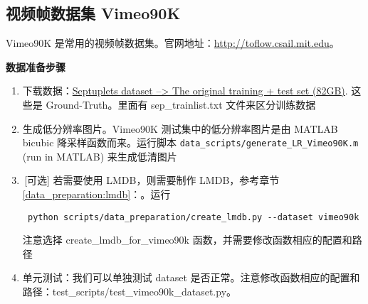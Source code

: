 \documentclass[../main.tex]{subfiles}
\begin{document}
\subsection{视频帧数据集 Vimeo90K}

Vimeo90K 是常用的视频帧数据集。官网地址：\url{http://toflow.csail.mit.edu}。

\noindent\textbf{数据准备步骤}
\begin{enumerate}
    \item 下载数据：\href{http://data.csail.mit.edu/tofu/dataset/vimeo_septuplet.zip}{Septuplets dataset --> The original training + test set (82GB)}. 这些是 Ground-Truth。里面有 sep\_trainlist.txt 文件来区分训练数据
    \item 生成低分辨率图片。Vimeo90K 测试集中的低分辨率图片是由 MATLAB bicubic 降采样函数而来。运行脚本 \texttt{data\_scripts/generate\_LR\_Vimeo90K.m} (run in MATLAB) 来生成低清图片
    \item\,[可选] 若需要使用 LMDB，则需要制作 LMDB，参考章节\ref{data_preparation:lmdb}：。运行
    \begin{verbatim}
 python scripts/data_preparation/create_lmdb.py --dataset vimeo90k
\end{verbatim}
    注意选择 create\_lmdb\_for\_vimeo90k 函数，并需要修改函数相应的配置和路径
    \item 单元测试：我们可以单独测试 dataset 是否正常。注意修改函数相应的配置和路径：test\_scripts/test\_vimeo90k\_dataset.py。
\end{enumerate}
\end{document}
